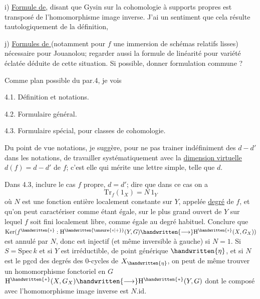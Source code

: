  i) \uline{Formule de}, disant que Gysin  sur la cohomologie à supports propres est transposé de l'homomorphisme image inverse. J'ai un sentiment que cela résulte tautologiquement de la définition, 

 j) \uline{Formules de } (notamment pour $f$ une immersion de schémas relatifs lisses)\handwritten{,} nécessaire pour Jouanolou; regarder aussi la formule de linéarité pour variété éclatée déduite de cette situation. Si possible, donner formulation commune ?

Comme plan possible du par.4, je vois

4.1. Définition et notations.

4.2. Formulaire général.

4.3. Formulaire spécial, pour classes de cohomologie.

Du point de vue notations, je suggère, pour ne pas trainer indéfiniment des $d-d'$ dans les notations, de travailler systématiquement avec la \uline{dimension virtuelle} $d(f)=d-d'$ de $f$; c'est elle qui mérite une lettre simple, telle que $d$.

Dans 4.3, inclure le cas $f$ propre, $d=d'$; dire que dans ce  cas on a
\[
\mathrm{Tr}_f(1_X)=N\,1_Y
\]
où $N$ est une fonction entière localement constante sur $Y$, appelée \uline{degré} de $f$, et qu'on peut caractériser comme étant égale, sur  le plus grand ouvert de $Y$ sur lequel $f$ soit fini localement libre, comme égale au degré habituel. Conclure que $\mathrm{Ker}(f^{\handwritten{*}}:\mathrm{H}^{\handwritten{\unsure{*|+}}}(Y,G)\handwritten{\longrightarrow}\mathrm{H}^{\handwritten{*}}(X,G_X))$ est annulé par $N$, donc est injectif (et même inversible à gauche) si $N=1$. \handwritten{[}Si $S=\mathrm{Spec}\,k$ et si $Y$ est irréductible, de point générique $\handwritten{\eta}$, et si $N$ est le pgcd des degrés des $0$-cycles de $X_{\handwritten{\eta}}$\inserted{\handwritten{$\neq\unsure{\phi|\varnothing}$}}, on peut de même trouver un homomorphisme\handwritten{,} fonctoriel en $G$\handwritten{\unsure{$\leftarrow$}}\handwritten{,} $\mathrm{H}^{\handwritten{*}}(X,G_X)\handwritten{\longrightarrow}\mathrm{H}^{\handwritten{*}}(Y,G)$ dont le composé avec l'homomorphisme image inverse est $N.\mathrm{id}$.\handwritten{]}
